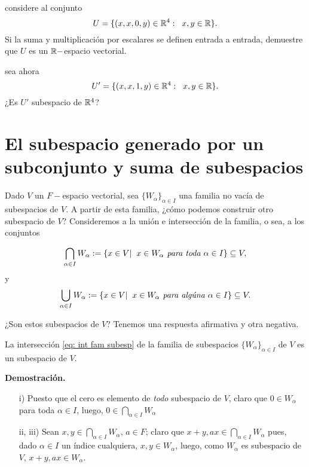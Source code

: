 	considere al conjunto 
	\[
	U = \{ (x, x, 0, y) \in \mathbb{R}^{4} : \hspace{0.2cm} x, y \in \mathbb{R}  \}.
	\]
	Si la suma y multiplicación por escalares se definen entrada a entrada,
	demuestre que $U$ es un $\mathbb{R}-$espacio vectorial.

sea ahora
\[
U' = \{ (x, x, 1, y) \in \mathbb{R}^{4} : \hspace{0.2cm} x, y \in \mathbb{R}  \}.
\]
¿Es $U'$ subespacio de $\mathbb{R}^{4}$?


\section{El subespacio generado por un subconjunto y suma de subespacios}


Dado $V$ un $F-$espacio vectorial, 
sea $\{ W_{\alpha} \}_{\alpha \in I}$ una familia no vacía de subespacios
de $V$. A partir de esta familia, ¿cómo podemos construir otro
subespacio de $V$?
Consideremos a la unión e intersección de la familia, o sea,
a los conjuntos

\begin{equation}
	\label{eq: int fam subesp}
	\bigcap_{\alpha \in I} W_{\alpha} :=
\{ x \in V  | \hspace{0.2cm} x \in W_{\alpha} \textit{ para toda }
\alpha \in I  \} \subseteq V,
\end{equation}
y
\begin{equation}
	\label{eq: union fam subesp}
	\bigcup_{\alpha \in I} W_{\alpha} :=
\{ x \in V  | \hspace{0.2cm} x \in W_{\alpha} \textit{ para algúna }
\alpha \in I  \} \subseteq V.
\end{equation}

¿Son estos subespacios de $V$?
Tenemos una
respuesta afirmativa y otra negativa.

\begin{prop}
La intersección \eqref{eq: int fam subesp} de la familia
de subespacios $\{ W_{\alpha} \}_{\alpha \in I}$
de $V$ es un subespacio de $V$.
\end{prop}
\noindent
\textbf{Demostración.}
\begin{itemize}
	\item[i)] Puesto que el cero es elemento de \textit{todo}
	subespacio de $V$, claro que $0 \in W_{\alpha}$ para
	toda $\alpha \in I$, luego, $0 \in \bigcap_{\alpha \in I} W_{\alpha}$
	\item[ii, iii)] Sean $x, y \in \bigcap_{\alpha \in I} W_{\alpha}$,
	$a \in F$; claro que 
	$x+y, ax \in \bigcap_{\alpha \in I} W_{\alpha}$
	pues, dado $\alpha \in I$ un índice cualquiera,
	$x, y \in W_{\alpha}$, luego, como 
	$W_{\alpha}$ es subespacio de $V$, $x+y, ax \in W_{\alpha}$.
\end{itemize}

